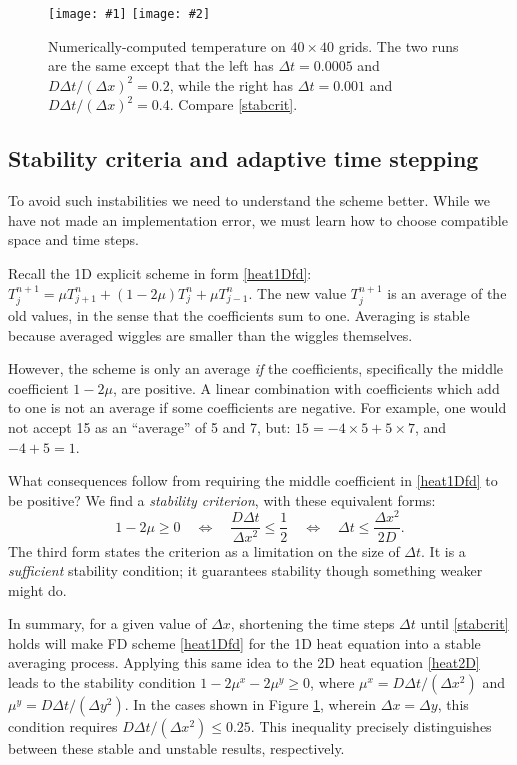 \documentclass[letterpaper,final,12pt,reqno]{amsart}
\newcommand{\twofigsizes}[5]{
\begin{figure}[ht]
\centering
\texttt{[image: \#1]} \quad
\texttt{[image: \#2]}
\caption{#3}
\label{fig:#1}
\end{figure}}
\newcommand{\twofig}[3]{\twofigsizes{#1}{#2}{#3}{2.5in}{2.5in}}
\begin{document}
\twofig{stability}{instability}{Numerically-computed temperature on $40\times 40$ grids.  The two runs are the same except that the left has $\Delta t=0.0005$ and $D\Delta t/(\Delta x)^2= 0.2$, while the right has $\Delta t=0.001$ and $D\Delta t/(\Delta x)^2= 0.4$.  Compare \eqref{stabcrit}.}

\subsection*{Stability criteria and adaptive time stepping}  To avoid such instabilities we need to understand the scheme better.  While we have not made an implementation error, we must learn how to choose compatible space and time steps.

Recall the 1D explicit scheme in form \eqref{heat1Dfd}: $T_j^{n+1} = \mu T_{j+1}^n + (1 - 2 \mu) T_j^n + \mu T_{j-1}^n$.  The new value $T_j^{n+1}$ is an average of the old values, in the sense that the coefficients sum to one.  Averaging is stable because averaged wiggles are smaller than the wiggles themselves.

However, the scheme is only an average \emph{if} the coefficients, specifically the middle coefficient $1-2\mu$, are positive.  A linear combination with coefficients which add to one is not an average if some coefficients are negative.  For example, one would not accept 15 as an ``average'' of 5 and 7, but: $15 = -4 \times 5 + 5 \times 7$, and $-4+5=1$.

What consequences follow from requiring the middle coefficient in \eqref{heat1Dfd} to be positive?  We find a \emph{stability criterion}, with these equivalent forms:
\begin{equation}
   1 - 2 \mu \ge 0 \quad \iff \quad \frac{D\Delta t}{\Delta x^2} \le \frac{1}{2} \quad \iff \quad \Delta t \le \frac{\Delta x^2}{2 D}.  \label{stabcrit}
\end{equation}
The third form states the criterion as a limitation on the size of $\Delta t$.  It is a \emph{sufficient} stability condition; it guarantees stability though something weaker might do.

In summary, for a given value of $\Delta x$, shortening the time steps $\Delta t$ until \eqref{stabcrit} holds will make FD scheme \eqref{heat1Dfd} for the 1D heat equation into a stable averaging process.  Applying this same idea to the 2D heat equation \eqref{heat2D} leads to the stability condition $1-2\mu^x-2\mu^y \ge 0$, where $\mu^x = D \Delta t / (\Delta x^2)$ and $\mu^y = D \Delta t / (\Delta y^2)$.  In the cases shown in Figure \ref{fig:stability}, wherein $\Delta x=\Delta y$, this condition requires $D \Delta t /(\Delta x^2) \le 0.25$.  This inequality precisely distinguishes between these stable and unstable results, respectively.
\end{document}
